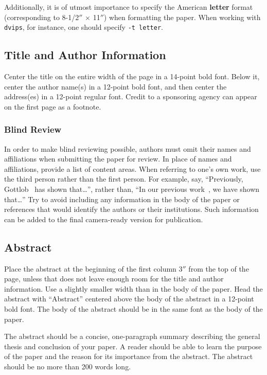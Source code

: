 \documentclass{article}
\begin{document}
Additionally, it is of utmost importance to specify the American {\bf
letter} format (corresponding to 8-1/2$''$ $\times$ 11$''$) when
formatting the paper. When working with {\tt dvips}, for instance, one
should specify {\tt -t letter}.

\subsection{Title and Author Information}

Center the title on the entire width of the page in a 14-point bold
font. Below it, center the author name(s) in a 12-point bold font, and
then center the address(es) in a 12-point regular font. Credit to a
sponsoring agency can appear on the first page as a footnote.

\subsubsection{Blind Review}

In order to make blind reviewing possible, authors must omit their
names and affiliations when submitting the paper for review. In place
of names and affiliations, provide a list of content areas. When
referring to one's own work, use the third person rather than the
first person. For example, say, ``Previously,
Gottlob~ has shown that\ldots'', rather
than, ``In our previous work~\cite{gottlob:nonmon}, we have shown
that\ldots'' Try to avoid including any information in the body of the
paper or references that would identify the authors or their
institutions. Such information can be added to the final camera-ready
version for publication.

\subsection{Abstract}

Place the abstract at the beginning of the first column 3$''$ from the
top of the page, unless that does not leave enough room for the title
and author information. Use a slightly smaller width than in the body
of the paper. Head the abstract with ``Abstract'' centered above the
body of the abstract in a 12-point bold font. The body of the abstract
should be in the same font as the body of the paper.

The abstract should be a concise, one-paragraph summary describing the
general thesis and conclusion of your paper. A reader should be able
to learn the purpose of the paper and the reason for its importance
from the abstract. The abstract should be no more than 200 words long.
\end{document}
